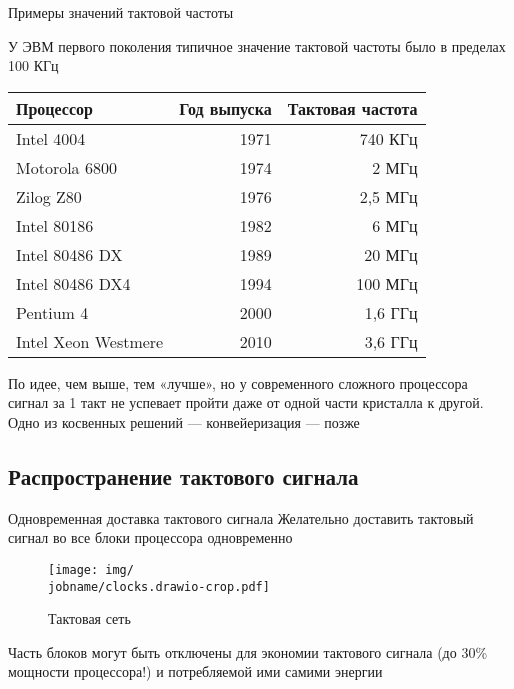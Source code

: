 \documentclass[xetex,aspectratio=43]{beamer}
\begin{document}
\begin{frame}{Примеры значений тактовой частоты}

        У ЭВМ первого поколения типичное значение тактовой частоты было в
        пределах 100 КГц

        \begin{center}
            \begin{tabular}[]{lrr}
                \hline
                Процессор & Год выпуска & Тактовая частота \\
                \hline
                Intel 4004 & 1971 & 740 КГц \\
                Motorola 6800 & 1974 & 2 МГц \\
                Zilog Z80 & 1976 & 2,5 МГц \\
                Intel 80186 & 1982 & 6 МГц \\
                Intel 80486 DX & 1989 & 20 МГц \\
                Intel 80486 DX4 & 1994 & 100 МГц \\
                Pentium 4 & 2000 & 1,6 ГГц \\
                Intel Xeon Westmere & 2010 & 3,6 ГГц \\
                \hline
            \end{tabular}
        \end{center}

        \pause

        По идее, чем выше, тем «лучше», но у современного сложного процессора
        сигнал за 1 такт не успевает пройти даже от одной части кристалла к другой. Одно из
        косвенных решений --- конвейеризация --- позже
\end{frame}

\subsection{Распространение тактового сигнала}

\begin{frame}{Одновременная доставка тактового сигнала}
    Желательно доставить тактовый сигнал во все блоки процессора одновременно
    \begin{figure}
        \texttt{[image: img/\\jobname/clocks.drawio-crop.pdf]}
        \caption{Тактовая сеть}
    \end{figure}
    \pause
    Часть блоков могут быть отключены для экономии тактового сигнала (до 30\% мощности процессора!)
    и потребляемой ими самими энергии
\end{frame}
\end{document}
